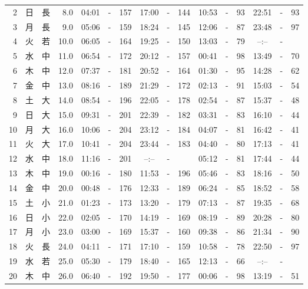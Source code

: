 \documentclass[12pt.a4j]{jsarticle}
\begin{document}
\begin{center}
\begin{table}[ht]
\begin{tabular}{|rc|cr|ccrccr|ccrccr|}
 2 & 日 & 長 &  8.0 &  04:01 &-& 157  &  17:00 &-& 144  &   10:53 &-&  93  &   22:51 &-&  93  \\
 3 & 月 & 長 &  9.0 &  05:06 &-& 159  &  18:24 &-& 145  &   12:06 &-&  87  &   23:48 &-&  97  \\
 4 & 火 & 若 & 10.0 &  06:05 &-& 164  &  19:25 &-& 150  &   13:03 &-&  79  &   --:-- &-&     \\
 5 & 水 & 中 & 11.0 &  06:54 &-& 172  &  20:12 &-& 157  &   00:41 &-&  98  &   13:49 &-&  70  \\
 6 & 木 & 中 & 12.0 &  07:37 &-& 181  &  20:52 &-& 164  &   01:30 &-&  95  &   14:28 &-&  62  \\
 7 & 金 & 中 & 13.0 &  08:16 &-& 189  &  21:29 &-& 172  &   02:13 &-&  91  &   15:03 &-&  54  \\
 8 & 土 & 大 & 14.0 &  08:54 &-& 196  &  22:05 &-& 178  &   02:54 &-&  87  &   15:37 &-&  48  \\
 9 & 日 & 大 & 15.0 &  09:31 &-& 201  &  22:39 &-& 182  &   03:31 &-&  83  &   16:10 &-&  44  \\
10 & 月 & 大 & 16.0 &  10:06 &-& 204  &  23:12 &-& 184  &   04:07 &-&  81  &   16:42 &-&  41  \\
11 & 火 & 大 & 17.0 &  10:41 &-& 204  &  23:44 &-& 183  &   04:40 &-&  80  &   17:13 &-&  41  \\
12 & 水 & 中 & 18.0 &  11:16 &-& 201  &  --:-- &-&     &   05:12 &-&  81  &   17:44 &-&  44  \\
13 & 木 & 中 & 19.0 &  00:16 &-& 180  &  11:53 &-& 196  &   05:46 &-&  83  &   18:16 &-&  50  \\
14 & 金 & 中 & 20.0 &  00:48 &-& 176  &  12:33 &-& 189  &   06:24 &-&  85  &   18:52 &-&  58  \\
15 & 土 & 小 & 21.0 &  01:23 &-& 173  &  13:20 &-& 179  &   07:13 &-&  87  &   19:35 &-&  68  \\
16 & 日 & 小 & 22.0 &  02:05 &-& 170  &  14:19 &-& 169  &   08:19 &-&  89  &   20:28 &-&  80  \\
17 & 月 & 小 & 23.0 &  03:00 &-& 169  &  15:37 &-& 160  &   09:38 &-&  86  &   21:34 &-&  90  \\
18 & 火 & 長 & 24.0 &  04:11 &-& 171  &  17:10 &-& 159  &   10:58 &-&  78  &   22:50 &-&  97  \\
19 & 水 & 若 & 25.0 &  05:30 &-& 179  &  18:40 &-& 165  &   12:13 &-&  66  &   --:-- &-&     \\
20 & 木 & 中 & 26.0 &  06:40 &-& 192  &  19:50 &-& 177  &   00:06 &-&  98  &   13:19 &-&  51  \\

\end{tabular}
\end{table}
\end{center}
\end{document}
